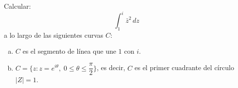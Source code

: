 \documentclass[11pt]{article}
\begin{document}
\begin{question}  %
    Calcular:
    \[ \int_1^i \bar{z}^2 \, dz \]
    a lo largo de las siguientes curvas $C$:
    \begin{enumerate}[a)]
        \item $C$ es el segmento de línea que une $1$ con $i$.
        \item $C = \{z : z = e^{i \theta}, \; 0 \leq \theta \leq \dfrac{\pi}{2}\} $, es decir, $C$ es el primer cuadrante del círculo $|Z| = 1$.
    \end{enumerate}
\end{question}
\end{document}
